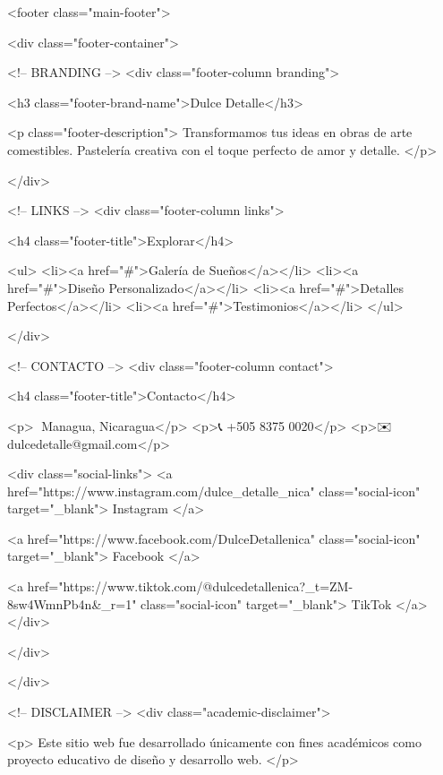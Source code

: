 <footer class="main-footer">

    <div class="footer-container">

        <!-- BRANDING -->
        <div class="footer-column branding">

            <h3 class="footer-brand-name">Dulce Detalle</h3>

            <p class="footer-description">
                Transformamos tus ideas en obras de arte comestibles.
                Pastelería creativa con el toque perfecto de amor y detalle.
            </p>

        </div>

        <!-- LINKS -->
        <div class="footer-column links">

            <h4 class="footer-title">Explorar</h4>

            <ul>
                <li><a href="#">Galería de Sueños</a></li>
                <li><a href="#">Diseño Personalizado</a></li>
                <li><a href="#">Detalles Perfectos</a></li>
                <li><a href="#">Testimonios</a></li>
            </ul>

        </div>

        <!-- CONTACTO -->
        <div class="footer-column contact">

            <h4 class="footer-title">Contacto</h4>

            <p>📍 Managua, Nicaragua</p>
            <p>📞 +505 8375 0020</p>
            <p>✉️ dulcedetalle@gmail.com</p>

            <div class="social-links">
                <a href="https://www.instagram.com/dulce_detalle_nica"
                class="social-icon"
                target="_blank">
                Instagram
                </a>

                <a href="https://www.facebook.com/DulceDetallenica"
                class="social-icon"
                target="_blank">
                Facebook
                </a>

                <a href="https://www.tiktok.com/@dulcedetallenica?_t=ZM-8sw4WmnPb4n&_r=1"
                class="social-icon"
                target="_blank">
                TikTok
                </a>
            </div>

        </div>

    </div>

    <!-- DISCLAIMER -->
    <div class="academic-disclaimer">

        <p>
            Este sitio web fue desarrollado únicamente con fines académicos
            como proyecto educativo de diseño y desarrollo web.
        </p>


